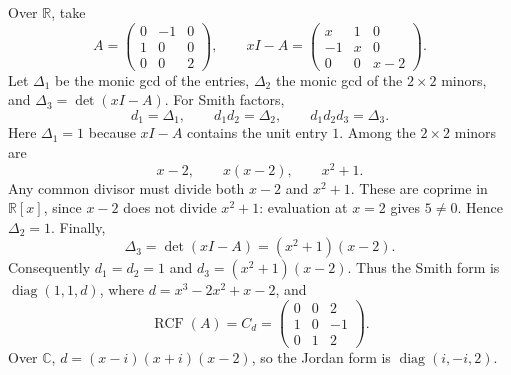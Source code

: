 \begin{example}
Over \(\mathbb R\), take
\[
A=\begin{pmatrix}0&-1&0\\1&0&0\\0&0&2\end{pmatrix},\qquad
xI-A=\begin{pmatrix}x&1&0\\-1&x&0\\0&0&x-2\end{pmatrix}.
\]
Let \(\Delta_1\) be the monic gcd of the entries, \(\Delta_2\) the monic gcd
of the \(2\times2\) minors, and \(\Delta_3=\det(xI-A)\). For Smith factors,
\[
d_1=\Delta_1,\qquad d_1d_2=\Delta_2,\qquad
d_1d_2d_3=\Delta_3.
\]
Here \(\Delta_1=1\) because \(xI-A\) contains the unit entry \(1\). Among
the \(2\times2\) minors are
\[
x-2,\qquad x(x-2),\qquad x^2+1.
\]
Any common divisor must divide both \(x-2\) and \(x^2+1\). These are
coprime in \(\mathbb R[x]\), since \(x-2\) does not divide \(x^2+1\):
evaluation at \(x=2\) gives \(5\ne0\). Hence \(\Delta_2=1\). Finally,
\[
\Delta_3=\det(xI-A)=(x^2+1)(x-2).
\]
Consequently \(d_1=d_2=1\) and
\(d_3=(x^2+1)(x-2)\). Thus the Smith form is
\(\operatorname{diag}(1,1,d)\), where
\(d=x^3-2x^2+x-2\), and
\[
\operatorname{RCF}(A)=C_d=
\begin{pmatrix}0&0&2\\1&0&-1\\0&1&2\end{pmatrix}.
\]
Over \(\mathbb C\), \(d=(x-i)(x+i)(x-2)\), so the Jordan form is
\(\operatorname{diag}(i,-i,2)\).
\end{example}

